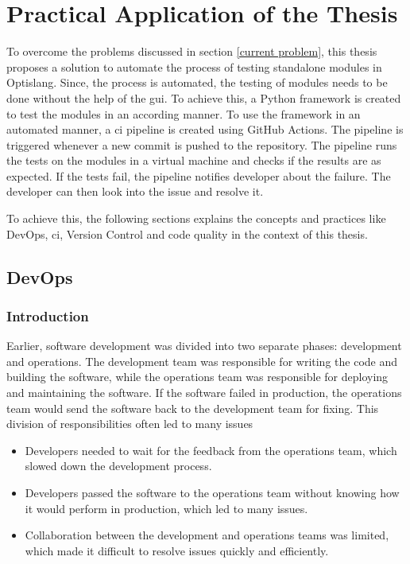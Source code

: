 \chapter{Practical Application of the Thesis}

To overcome the problems discussed in section \ref{current problem}, this thesis proposes a solution to automate the process of testing standalone modules
in Optislang. Since, the process is automated, the testing of modules needs to be done without the help of the \acrshort{gui}. To achieve this, a Python framework is created to test the modules in an according manner. To use the framework in an automated manner, a \acrshort{ci} pipeline is created using GitHub Actions. The pipeline 
is triggered whenever a new commit is pushed to the repository. The pipeline runs the tests on the modules in a virtual machine and checks if the results are as expected. If the tests 
fail, the pipeline notifies  developer about the failure. The developer can then look into the issue and resolve it. 

To achieve this, the following sections explains the concepts and practices like DevOps, \acrlong{ci}, Version Control and code quality in the context of this thesis.

\section{DevOps}
\subsection{Introduction}
Earlier, software development was divided into two separate phases: development and operations. The development team was responsible for writing the code and 
building the software, while the operations team was responsible for deploying and maintaining the software. If the software failed in production, the operations 
team would send the software back to the development team for fixing. This division of responsibilities often led to many issues
\begin{itemize}
    \item Developers needed to wait for the feedback from the operations team, which slowed down the development process.
    \item Developers passed the software to the operations team without knowing how it would perform in production, which led to many issues.
    \item Collaboration between the development and operations teams was limited, which made it difficult to resolve issues quickly and efficiently.
\end{itemize}

